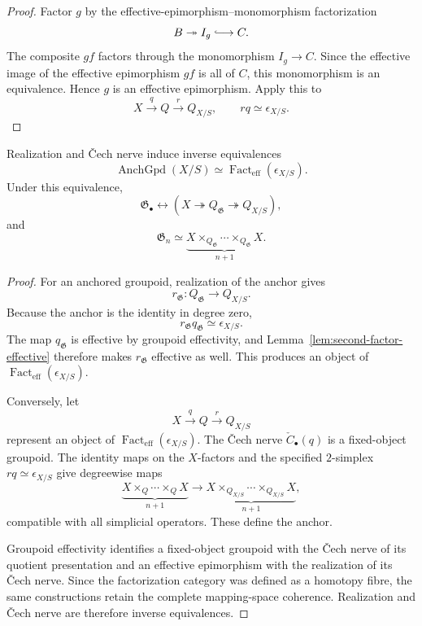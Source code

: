 \begin{proof}
Factor $g$ by the effective-epimorphism--monomorphism factorization
\[
    B\twoheadrightarrow I_g\lhook\joinrel\longrightarrow C.
\]
The composite $gf$ factors through the monomorphism $I_g\to C$.  Since the
effective image of the effective epimorphism $gf$ is all of $C$, this
monomorphism is an equivalence.  Hence $g$ is an effective epimorphism.
Apply this to
\[
    X\xrightarrow{q}Q\xrightarrow{r}Q_{X/S},
    \qquad
    rq\simeq\epsilon_{X/S}.
\]
\end{proof}

\begin{theorem}
\label{thm:anchored-gpd-quotient-classification}
Realization and \v{C}ech nerve induce inverse equivalences
\[
    \operatorname{AnchGpd}(X/S)
    \simeq
    \operatorname{Fact}_{\mathrm{eff}}(\epsilon_{X/S}).
\]
Under this equivalence,
\[
    \mathfrak G_\bullet
    \longleftrightarrow
    \left(
        X\twoheadrightarrow Q_{\mathfrak G}
        \twoheadrightarrow Q_{X/S}
    \right),
\]
and
\[
    \mathfrak G_n
    \simeq
    \underbrace{
    X\times_{Q_{\mathfrak G}}\cdots
    \times_{Q_{\mathfrak G}}X
    }_{n+1}.
\]
\end{theorem}

\begin{proof}
For an anchored groupoid, realization of the anchor gives
\[
    r_{\mathfrak G}:
    Q_{\mathfrak G}
    \longrightarrow
    Q_{X/S}.
\]
Because the anchor is the identity in degree zero,
\[
    r_{\mathfrak G}q_{\mathfrak G}
    \simeq
    \epsilon_{X/S}.
\]
The map $q_{\mathfrak G}$ is effective by groupoid effectivity, and
Lemma~\ref{lem:second-factor-effective} therefore makes
$r_{\mathfrak G}$ effective as well.  This produces an object of
$\operatorname{Fact}_{\mathrm{eff}}(\epsilon_{X/S})$.

Conversely, let
\[
    X\xrightarrow{q}Q\xrightarrow{r}Q_{X/S}
\]
represent an object of
$\operatorname{Fact}_{\mathrm{eff}}(\epsilon_{X/S})$.  The \v{C}ech nerve
$\check C_\bullet(q)$ is a fixed-object groupoid.  The identity maps on the
$X$-factors and the specified $2$-simplex
$rq\simeq\epsilon_{X/S}$ give degreewise maps
\[
    \underbrace{X\times_Q\cdots\times_QX}_{n+1}
    \longrightarrow
    \underbrace{
    X\times_{Q_{X/S}}\cdots\times_{Q_{X/S}}X
    }_{n+1},
\]
compatible with all simplicial operators.  These define the anchor.

Groupoid effectivity identifies a fixed-object groupoid with the \v{C}ech
nerve of its quotient presentation and an effective epimorphism with the
realization of its \v{C}ech nerve.  Since the factorization category was
defined as a homotopy fibre, the same constructions retain the complete
mapping-space coherence.  Realization and \v{C}ech nerve are therefore inverse
equivalences.
\end{proof}

